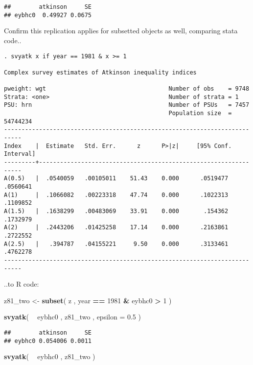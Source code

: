 \documentclass[]{book}
\newenvironment{Shaded}{\begin{snugshade}}{\end{snugshade}}
\newcommand{\DataTypeTok}[1]{\textcolor[rgb]{0.13,0.29,0.53}{#1}}
\newcommand{\DecValTok}[1]{\textcolor[rgb]{0.00,0.00,0.81}{#1}}
\newcommand{\FloatTok}[1]{\textcolor[rgb]{0.00,0.00,0.81}{#1}}
\newcommand{\KeywordTok}[1]{\textcolor[rgb]{0.13,0.29,0.53}{\textbf{#1}}}
\newcommand{\NormalTok}[1]{#1}
\newcommand{\OperatorTok}[1]{\textcolor[rgb]{0.81,0.36,0.00}{\textbf{#1}}}
\newcommand{\StringTok}[1]{\textcolor[rgb]{0.31,0.60,0.02}{#1}}
\begin{document}
\begin{verbatim}
##        atkinson     SE
## eybhc0  0.49927 0.0675
\end{verbatim}

Confirm this replication applies for subsetted objects as well, comparing stata code..

\begin{verbatim}
. svyatk x if year == 1981 & x >= 1

Complex survey estimates of Atkinson inequality indices
 
pweight: wgt                                   Number of obs    = 9748
Strata: <one>                                  Number of strata = 1
PSU: hrn                                       Number of PSUs   = 7457
                                               Population size  = 54744234
---------------------------------------------------------------------------
Index    |  Estimate   Std. Err.      z      P>|z|     [95% Conf. Interval]
---------+-----------------------------------------------------------------
A(0.5)   |  .0540059   .00105011    51.43    0.000      .0519477   .0560641
A(1)     |  .1066082   .00223318    47.74    0.000      .1022313   .1109852
A(1.5)   |  .1638299   .00483069    33.91    0.000       .154362   .1732979
A(2)     |  .2443206   .01425258    17.14    0.000      .2163861   .2722552
A(2.5)   |   .394787   .04155221     9.50    0.000      .3133461   .4762278
---------------------------------------------------------------------------
\end{verbatim}

..to R code:

\begin{Shaded}
\begin{Highlighting}[]
\NormalTok{z81_two <-}\StringTok{ }\KeywordTok{subset}\NormalTok{( z , year }\OperatorTok{==}\StringTok{ }\DecValTok{1981} \OperatorTok{&}\StringTok{ }\NormalTok{eybhc0 }\OperatorTok{>}\StringTok{ }\DecValTok{1}\NormalTok{ )}

\KeywordTok{svyatk}\NormalTok{( }\OperatorTok{~}\StringTok{ }\NormalTok{eybhc0 , z81_two , }\DataTypeTok{epsilon =} \FloatTok{0.5}\NormalTok{ )}
\end{Highlighting}
\end{Shaded}

\begin{verbatim}
##        atkinson     SE
## eybhc0 0.054006 0.0011
\end{verbatim}

\begin{Shaded}
\begin{Highlighting}[]
\KeywordTok{svyatk}\NormalTok{( }\OperatorTok{~}\StringTok{ }\NormalTok{eybhc0 , z81_two )}
\end{Highlighting}
\end{Shaded}
\end{document}
